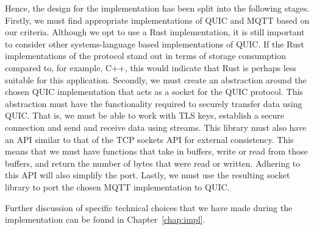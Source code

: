 Hence, the design for the implementation has been split into the following stages.
Firstly, we must find appropriate implementations of QUIC and MQTT based on our criteria.
Although we opt to use a Rust implementation, it is still important to consider other systems-language based implementations of QUIC.
If the Rust implementations of the protocol stand out in terms of storage consumption compared to, for example, C++, this would indicate that Rust is perhaps less suitable for this application.
Secondly, we must create an abstraction around the chosen QUIC implementation that acts as a socket for the QUIC protocol.
This abstraction must have the functionality required to securely transfer data using QUIC.
That is, we must be able to work with TLS keys, establish a secure connection and send and receive data using streams.
This library must also have an API similar to that of the TCP sockets API for external consistency.
This means that we must have functions that take in buffers, write or read from those buffers, and return the number of bytes that were read or written.
Adhering to this API will also simplify the port.
Lastly, we must use the resulting socket library to port the chosen MQTT implementation to QUIC.

Further discussion of specific technical choices that we have made during the implementation can be found in Chapter~\ref{chap:impl}.



